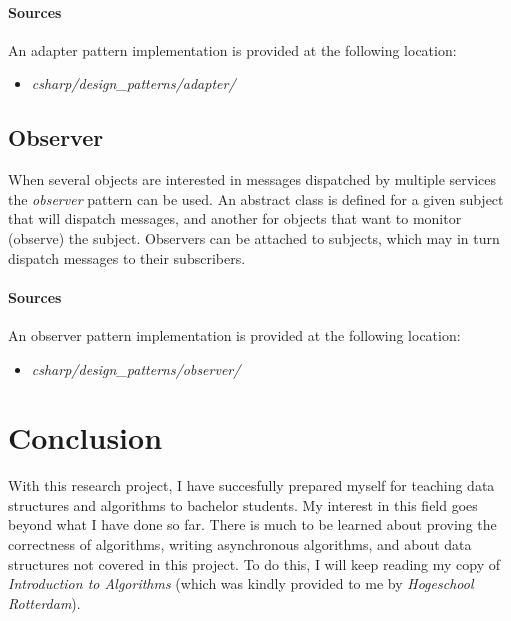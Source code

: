 \documentclass{article}
\begin{document}
{\begin{samepage}
  \paragraph{Sources}
  An adapter pattern implementation is provided at the following location:
  \begin{itemize}
  \item{{\em csharp/design\_patterns/adapter/}}
  \end{itemize}
\end{samepage}


\subsection{Observer}
When several objects are interested in messages dispatched by multiple services the {\em observer} pattern can be used.
An abstract class is defined for a given subject that will dispatch messages, and another for objects that want to monitor
(observe) the subject. Observers can be attached to subjects, which may in turn dispatch messages to their subscribers.

\begin{samepage}
  \paragraph{Sources}
  An observer pattern implementation is provided at the following location:
  \begin{itemize}
  \item{{\em csharp/design\_patterns/observer/}}
  \end{itemize}
\end{samepage}


\newpage


\section{Conclusion}
With this research project, I have succesfully prepared myself for teaching data structures and algorithms to bachelor students.
My interest in this field goes beyond what I have done so far. There is much to be learned about proving the correctness of
algorithms, writing asynchronous algorithms, and about data structures not covered in this project. To do this, I will keep
reading my copy of {\em Introduction to Algorithms} (which was kindly provided to me by {\em Hogeschool Rotterdam}).

}
\end{document}
